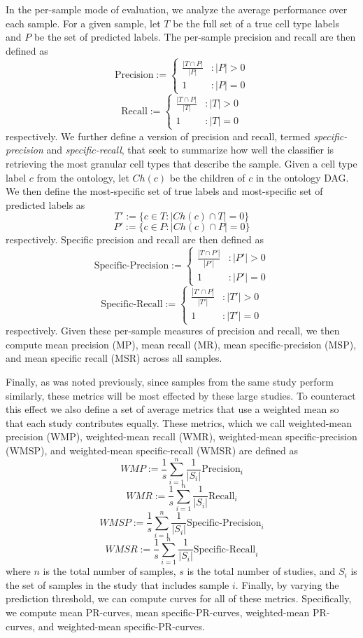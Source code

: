 In the per-sample mode of evaluation, we analyze the average performance over each sample. For a given sample, let $T$ be the full set of a true cell type labels and $P$ be the set of predicted labels. The per-sample precision and recall are then defined as
$$
   \text{Precision} := \left\{
     \begin{array}{lr}
       \frac{|T \cap P|}{|P|} & : |P| > 0  \\
       1 & : |P| = 0
     \end{array}
   \right.
$$
$$\text{Recall} := \left\{
     \begin{array}{lr}
       \frac{|T \cap P|}{|T|} & : |T| > 0  \\
       1 & : |T| = 0
     \end{array}
   \right.$$
respectively.  We further define a version of precision and recall, termed \textit{specific-precision} and \textit{specific-recall}, that seek to summarize how well the classifier is retrieving the most granular cell types that describe the sample. Given a cell type label $c$ from the ontology, let $Ch(c)$ be the children of $c$ in the ontology DAG. We then define the most-specific set of true labels and most-specific set of predicted labels as
$$T' := \{c \in T : |Ch(c) \cap T| = 0 \}$$
$$P' := \{c \in P : |Ch(c) \cap P| = 0 \}$$
respectively. Specific precision and recall are then defined as
$$\text{Specific-Precision} := \left\{
     \begin{array}{lr}
       \frac{|T \cap P'|}{|P'|} & : |P'| > 0  \\
       1 & : |P'| = 0
     \end{array}
     \right.$$
$$\text{Specific-Recall} := \left\{
     \begin{array}{lr}
       \frac{|T' \cap P|}{|T'|} & : |T'| > 0  \\
       1 & : |T'| = 0
     \end{array}
     \right.$$
respectively. Given these per-sample measures of precision and recall, we then compute mean precision (MP), mean recall (MR), mean specific-precision (MSP), and mean specific recall (MSR) across all samples. 

Finally, as was noted previously, since samples from the same study perform similarly, these metrics will be most effected by these large studies. To counteract this effect we also define a set of average metrics that use a weighted mean so that each study contributes equally. These metrics, which we call weighted-mean precision (WMP), weighted-mean recall (WMR), weighted-mean specific-precision (WMSP), and weighted-mean specific-recall (WMSR) are defined as
$$WMP := \frac{1}{s}\sum_{i=1}^n \frac{1}{|S_i|}\text{Precision}_i$$
$$WMR := \frac{1}{s}\sum_{i=1}^n \frac{1}{|S_i|}\text{Recall}_i$$
$$WMSP := \frac{1}{s}\sum_{i=1}^n \frac{1}{|S_i|}\text{Specific-Precision}_i$$
$$WMSR := \frac{1}{s}\sum_{i=1}^n \frac{1}{|S_i|}\text{Specific-Recall}_i$$
where $n$ is the total number of samples, $s$ is the total number of studies, and $S_i$ is the set of samples in the study that includes sample $i$. Finally, by varying the prediction threshold, we can compute curves for all of these metrics. Specifically, we compute mean PR-curves, mean specific-PR-curves, weighted-mean PR-curves, and weighted-mean specific-PR-curves.

